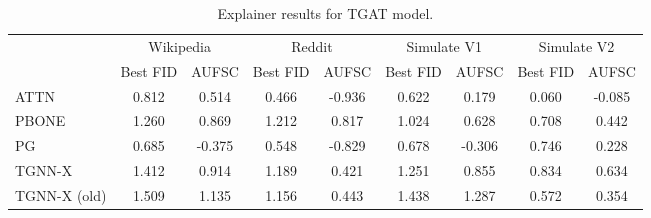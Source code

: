 \begin{table}
\centering
\begin{tabular}{lcccccccc}
\toprule
 & \multicolumn{2}{c}{Wikipedia} & \multicolumn{2}{c}{Reddit} & \multicolumn{2}{c}{Simulate V1} & \multicolumn{2}{c}{Simulate V2} \\
 & Best FID & AUFSC & Best FID & AUFSC & Best FID & AUFSC & Best FID & AUFSC \\
\midrule
ATTN & 0.812 & 0.514 & 0.466 & -0.936 & 0.622 & 0.179 & 0.060 & -0.085 \\
PBONE & 1.260 & 0.869 & 1.212 & 0.817 & 1.024 & 0.628 & 0.708 & 0.442 \\
PG & 0.685 & -0.375 & 0.548 & -0.829 & 0.678 & -0.306 & 0.746 & 0.228 \\
TGNN-X & 1.412 & 0.914 & 1.189 & 0.421 & 1.251 & 0.855 & 0.834 & 0.634 \\
TGNN-X (old) & 1.509 & 1.135 & 1.156 & 0.443 & 1.438 & 1.287 & 0.572 & 0.354 \\
\bottomrule
\end{tabular}
\caption{\label{tab:tgat_results}Explainer results for TGAT model.}
\end{table}
